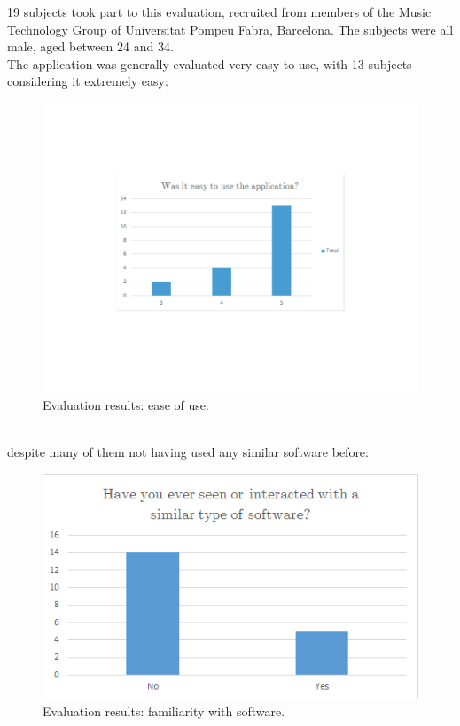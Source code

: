 19 subjects took part to this evaluation, recruited from members of the Music Technology Group of Universitat Pompeu Fabra, Barcelona. The subjects were all male, aged between 24 and 34. \\ \vspace{0.5cm}
The application was generally evaluated very easy to use, with 13 subjects considering it extremely easy: \\
\begin{figure}[h]
\begin{center}
\includegraphics[scale=0.5]{Figures/easytouse.pdf}
  \caption[Evaluation results: ease of use]{Evaluation results: ease of use.}
\end{center}
\end{figure}
\\
despite many of them not having used any similar software before: \\
\begin{figure}[h]
\begin{center}
\includegraphics[scale=0.5]{Figures/similarsoftware.png}
  \caption[Evaluation results: familiarity with software]{Evaluation results: familiarity with software.}
\end{center}
\end{figure}

